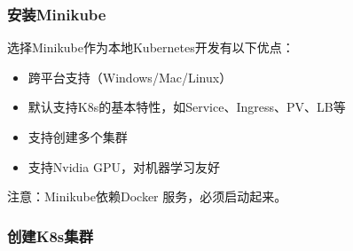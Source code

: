 \documentclass[12pt]{article}
\begin{document}
\subsubsection{安装Minikube}\label{ux5b89ux88c5minikube}

选择Minikube作为本地Kubernetes开发有以下优点：

\begin{itemize}
\tightlist
\item
  跨平台支持（Windows/Mac/Linux）
\item
  默认支持K8s的基本特性，如Service、Ingress、PV、LB等
\item
  支持创建多个集群
\item
  支持Nvidia GPU，对机器学习友好
\end{itemize}

\begin{Shaded}
\begin{Highlighting}[]
 
\end{Highlighting}
\end{Shaded}

注意：Minikube依赖Docker 服务，必须启动起来。

\subsubsection{创建K8s集群}\label{ux521bux5efak8sux96c6ux7fa4}

\begin{Shaded}
\begin{Highlighting}[]
\DataTypeTok{\textbackslash{}}
    \OperatorTok{=}\DataTypeTok{\textbackslash{}}
    \OperatorTok{=}\DataTypeTok{\textbackslash{}}
    \OperatorTok{=}\DataTypeTok{\textbackslash{}}
    \OperatorTok{=}\DataTypeTok{\textbackslash{}}
    \OperatorTok{=}\DataTypeTok{\textbackslash{}}
    \OperatorTok{=}
\end{Highlighting}
\end{Shaded}
\end{document}
